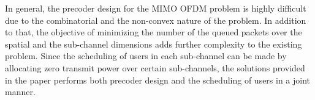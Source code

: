 

In general, the precoder design for the \ac{MIMO} \ac{OFDM} problem is highly difficult due to the combinatorial and the non-convex nature of the problem. In addition to that, the objective of minimizing the number of the queued packets over the spatial and the sub-channel dimensions adds further complexity to the existing problem. Since the scheduling of users in each sub-channel can be made by allocating zero transmit power over certain sub-channels, the solutions provided in the paper performs both precoder design and the scheduling of users in a joint manner.